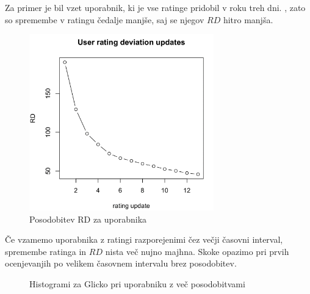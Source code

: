 \documentclass{IEEEtran}
\begin{document}
Za primer je bil vzet uporabnik, ki je vse ratinge pridobil v roku treh dni. , zato so spremembe v ratingu čedalje manjše, saj se njegov $RD$ hitro manjša.
\begin{figure}[h!]
    \includegraphics[width=8cm]{RDUserExample}
    \caption{Posodobitev RD za uporabnika}%
    \label{fig:example}%
\end{figure}
\newpage
Če vzamemo uporabnika z ratingi razporejenimi čez večji časovni interval, spremembe ratinga in $RD$ nista več nujno majhna. Skoke opazimo pri prvih ocenjevanjih po velikem časovnem intervalu brez posodobitev.

\begin{figure}[h!]
    \caption{Histogrami za Glicko pri uporabniku z več posodobitvami}%
    \label{fig:example}%
\end{figure}
\end{document}

